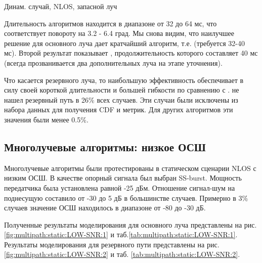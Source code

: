 \begin{table}[H]
  \begin{center}
    \caption{Динам. случай, NLOS, запасной луч}
    \label{tab:multipath:rotation:NLOS:2}
  \end{center}
\end{table}


Длительность алгоритмов находится в диапазоне от 32 до 64 мс, что соответствует повороту на 3.2 - 6.4 град.
Мы снова видим, что наилучшее решение для основного луча дает кратчайший алгоритм, т.е.
\AuxBeam (требуется 32-40 мс). Второй результат показывает \hSearchMMSE, продолжительность которого составляет
40 мс (всегда прозванивается два дополнительных луча на этапе уточнения). 

Что касается резервного луча, то наибольшую эффективность обеспечивает \hSearchMMSE в силу своей короткой длительности 
и большей гибкости по сравнению с \AuxBeam.
\ACS не нашел резервный путь в 26\% всех случаев. Эти случаи
были исключены из набора данных для получения CDF и метрик. Для других алгоритмов эти значения были
менее 0.5\%.

\subsection{Многолучевые алгоритмы: низкое ОСШ}
Многолучевые алгоритмы были протестированы в статическом сценарии NLOS с низким
ОСШ. В качестве опорный сигнала был выбран SS-burst. 
Мощность передатчика была установлена равной -25
дБм. Отношение сигнал-шум на поднесущую составило от -30 до 5 дБ в
большинстве случаев. Примерно в 3\% случаев значение ОСШ находилось в
диапазоне от -80 до -30 дБ.

Полученные результаты моделирования для основного луча представлены на
рис.\ref{fig:multipath:static:LOW-SNR:1} и 
таб.\ref{tab:multipath:static:LOW-SNR:1}. Результаты моделирования для
резервного пути представлены на рис. \ref{fig:multipath:static:LOW-SNR:2} и таб.
\ref{tab:multipath:static:LOW-SNR:2}.

